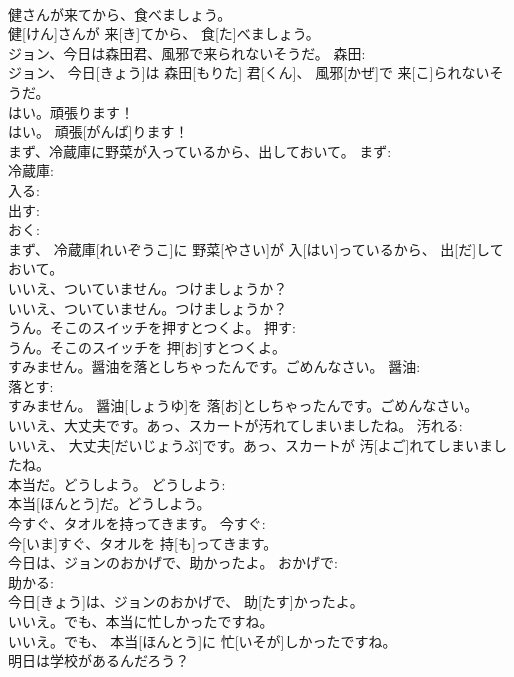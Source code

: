 \documentclass[8pt]{extreport}
\begin{document}
\begin{CJK}{UTF8}{min}
\\	健さんが来てから、食べましょう。	
\\	健[けん]さんが 来[き]てから、 食[た]べましょう。	
\\	ジョン、今日は森田君、風邪で来られないそうだ。	森田: 
\\	ジョン、 今日[きょう]は 森田[もりた] 君[くん]、 風邪[かぜ]で 来[こ]られないそうだ。	
\\	はい。頑張ります！	
\\	はい。 頑張[がんば]ります！	
\\	まず、冷蔵庫に野菜が入っているから、出しておいて。	まず: 
\\	冷蔵庫: 
\\	入る: 
\\	出す: 
\\	おく: 
\\	まず、 冷蔵庫[れいぞうこ]に 野菜[やさい]が 入[はい]っているから、 出[だ]しておいて。	
\\	いいえ、ついていません。つけましょうか？	
\\	いいえ、ついていません。つけましょうか？	
\\	うん。そこのスイッチを押すとつくよ。	押す: 
\\	うん。そこのスイッチを 押[お]すとつくよ。	
\\	すみません。醤油を落としちゃったんです。ごめんなさい。	醤油: 
\\	落とす: 
\\	すみません。 醤油[しょうゆ]を 落[お]としちゃったんです。ごめんなさい。	
\\	いいえ、大丈夫です。あっ、スカートが汚れてしまいましたね。	汚れる: 
\\	いいえ、 大丈夫[だいじょうぶ]です。あっ、スカートが 汚[よご]れてしまいましたね。	
\\	本当だ。どうしよう。	どうしよう: 
\\	本当[ほんとう]だ。どうしよう。	
\\	今すぐ、タオルを持ってきます。	今すぐ: 
\\	今[いま]すぐ、タオルを 持[も]ってきます。	
\\	今日は、ジョンのおかげで、助かったよ。	おかげで: 
\\	助かる: 
\\	今日[きょう]は、ジョンのおかげで、 助[たす]かったよ。	
\\	いいえ。でも、本当に忙しかったですね。	
\\	いいえ。でも、 本当[ほんとう]に 忙[いそが]しかったですね。	
\\	明日は学校があるんだろう？	

\end{CJK}
\end{document}
